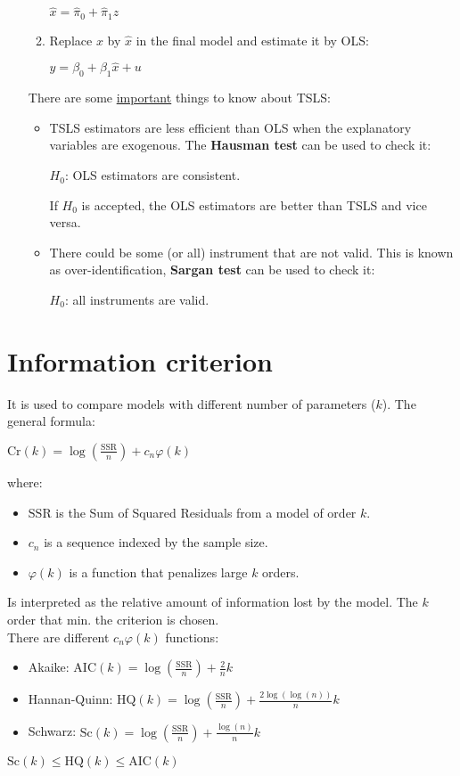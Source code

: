 \documentclass[10pt, a4paper, landscape]{extarticle}
\newcommand{\SSR}{\mathrm{SSR}}
\begin{document}
\begin{multicols}{3}
\begin{itemize}[leftmargin=*]
\begin{enumerate}[leftmargin=*]
\begin{center}
						$\hat{x} = \hat{\pi}_0 + \hat{\pi}_1 z$
					\end{center}
					\item Replace $x$ by $\hat{x}$ in the final model and estimate it by OLS:
					\begin{center}
						$y = \beta_0 + \beta_1 \hat{x} + u$
					\end{center}
				\end{enumerate}
				There are some \underline{important} things to know about TSLS:
				\begin{itemize}[leftmargin=*]
					\item TSLS estimators are less efficient than OLS when the explanatory variables are exogenous. The \textbf{Hausman test} can be used to check it:
					\begin{center}
						$H_0$: OLS estimators are consistent.
					\end{center}
					If $H_0$ is accepted, the OLS estimators are better than TSLS and vice versa.
					\item There could be some (or all) instrument that are not valid. This is known as over-identification, \textbf{Sargan test} can be used to check it:
					\begin{center}
						$H_0$: all instruments are valid.
					\end{center}
				\end{itemize}
			\end{itemize}
\columnbreak
\section*{Information criterion}
	It is used to compare models with different number of parameters ($k$). The general formula:
	\begin{center}
		$\mathrm{Cr}(k) = \log(\frac{\SSR}{n}) + c_n \varphi (k)$
	\end{center}
	where:
	\begin{itemize}[leftmargin=*]
		\item $\SSR$ is the Sum of Squared Residuals from a model of order $k$.
		\item $c_n$ is a sequence indexed by the sample size.
		\item $\varphi(k)$ is a function that penalizes large $k$ orders.
	\end{itemize}
	Is interpreted as the relative amount of information lost by the model. The $k$ order that min. the criterion is chosen. \\
	There are different $c_n \varphi(k)$ functions:
	\begin{itemize}[leftmargin=*]
		\item Akaike: $\mathrm{AIC}(k) = \log(\frac{\SSR}{n}) + \frac{2}{n} k$
		\item Hannan-Quinn: $\mathrm{HQ}(k) = \log(\frac{\SSR}{n}) + \frac{2 \log(\log(n))}{n} k$
		\item Schwarz: $\mathrm{Sc}(k) = \log(\frac{\SSR}{n}) + \frac{\log(n)}{n} k$
	\end{itemize}
	$\mathrm{Sc}(k) \leq \mathrm{HQ}(k) \leq \mathrm{AIC}(k)$


\end{multicols}
\end{document}
